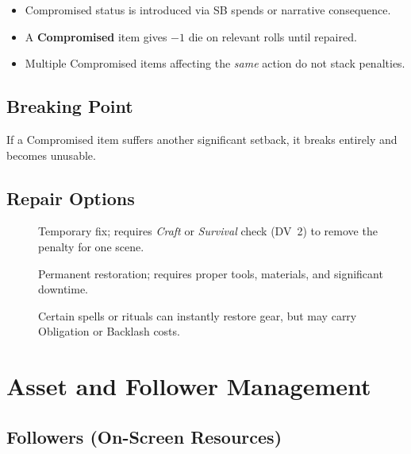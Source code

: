 \begin{itemize}
\item Compromised status is introduced via SB spends or narrative consequence. 
\item A \textbf{Compromised} item gives $-1$ die on relevant rolls until repaired. 
\item Multiple Compromised items affecting the \emph{same} action do not stack penalties.
\end{itemize}

\subsection{Breaking Point}
\label{subsec:gear-breaking}

If a Compromised item suffers another significant setback, it breaks entirely and becomes unusable.

\subsection{Repair Options}
\label{subsec:gear-repair}

\begin{description}
\item[] Temporary fix; requires \emph{Craft} or \emph{Survival} check (DV~2) to remove the penalty for one scene. 
\item[] Permanent restoration; requires proper tools, materials, and significant downtime. 
\item[] Certain spells or rituals can instantly restore gear, but may carry Obligation or Backlash costs. 
\end{description}

\section{Asset and Follower Management}
\label{sec:asset-management}

\subsection{Followers (On-Screen Resources)}
\label{subsec:followers}

